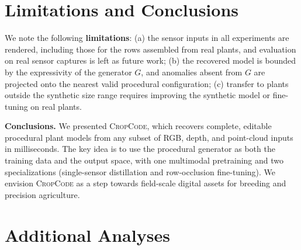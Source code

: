 \documentclass[10pt,twocolumn,letterpaper]{article}
\newcommand{\method}{\textup{\textsc{CropCode}}}   %
\begin{document}
\section{Limitations and Conclusions}
\label{sec:discussion}\label{sec:conclusion}

We note the following \noindent\textbf{limitations}: (a) the sensor inputs in all experiments are rendered, including those for the rows assembled from real plants, and evaluation on real sensor captures is left as future work; (b) the recovered model is bounded by the expressivity of the generator $G$, and anomalies absent from $G$ are projected onto the nearest valid procedural configuration; (c) transfer to plants outside the synthetic size range requires improving the synthetic model or fine-tuning on real plants. %
%

\noindent\textbf{Conclusions.}
We presented \method{}, which recovers complete, editable procedural plant models from any subset of RGB, depth, and point-cloud inputs in milliseconds. The key idea is to use the procedural generator as both the training data and the output space, with one multimodal pretraining and two specializations (single-sensor distillation and row-occlusion fine-tuning). We envision \method{} as a step towards field-scale digital assets for breeding and precision agriculture.

\clearpage %



\appendix
\clearpage

\section{Additional Analyses}
\label{app:analyses}
\end{document}
